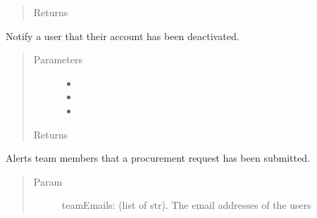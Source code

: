 \documentclass[letterpaper,10pt,english]{sphinxmanual}
\begin{document}
\begin{fulllineitems}
\begin{fulllineitems}
\begin{quote}
\begin{description}
\item[{Returns}] \leavevmode


\end{description}\end{quote}

\end{fulllineitems}


\begin{fulllineitems}
\label{\detokenize{apidoc/utdesign_procurement:utdesign_procurement.emailer.EmailHandler.notifyUserRemove}}
Notify a user that their account has been deactivated.
\begin{quote}\begin{description}
\item[{Parameters}] \leavevmode\begin{itemize}
\item {} 
 \textendash{} 

\item {} 
 \textendash{} 

\item {} 
 \textendash{} 

\end{itemize}

\item[{Returns}] \leavevmode


\end{description}\end{quote}

\end{fulllineitems}


\begin{fulllineitems}
\label{\detokenize{apidoc/utdesign_procurement:utdesign_procurement.emailer.EmailHandler.procurementEditAdmin}}
Alerts team members that a procurement request has been submitted.
\begin{quote}\begin{description}
\item[{Param}] \leavevmode
teamEmails: (list of str). The email addresses of the users


\end{description}
\end{quote}
\end{fulllineitems}
\end{fulllineitems}
\end{document}
